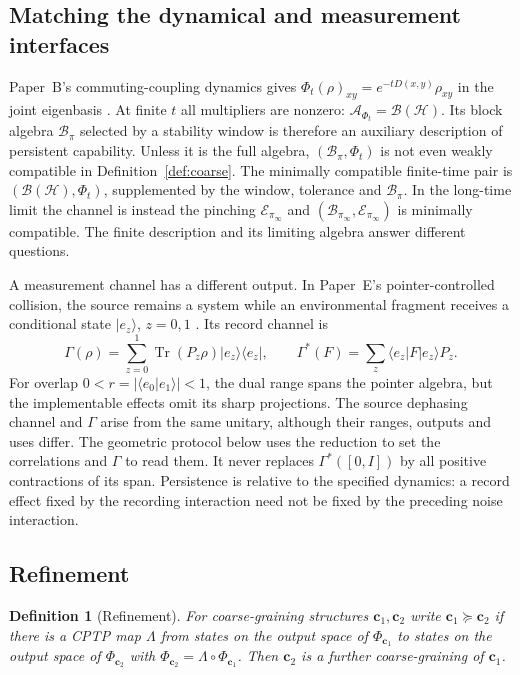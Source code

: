 \documentclass[12pt,a4paper]{article}
\newtheorem{definition}[theorem]{Definition}
\begin{document}
\subsection{Matching the dynamical and measurement interfaces}
\label{sec:interfaces}

Paper~B's commuting-coupling dynamics gives
$\Phi_t(\rho)_{xy}=e^{-tD(x,y)}\rho_{xy}$ in the joint eigenbasis
\cite{Liu2026PaperB}. At finite $t$ all multipliers are nonzero:
$\mathcal A_{\Phi_t}=\mathcal B(\mathcal H)$. Its block algebra
$\mathcal B_\pi$ selected by a stability window is therefore an auxiliary
description of persistent capability. Unless it is the full algebra,
$(\mathcal B_\pi,\Phi_t)$ is not even weakly compatible in
Definition~\ref{def:coarse}. The minimally compatible finite-time pair is
$(\mathcal B(\mathcal H),\Phi_t)$, supplemented by the window, tolerance
and $\mathcal B_\pi$. In the long-time limit the channel is instead the
pinching $\mathcal E_{\pi_\infty}$ and
$(\mathcal B_{\pi_\infty},\mathcal E_{\pi_\infty})$ is minimally
compatible. The finite description and its limiting algebra answer
different questions.

A measurement channel has a different output. In Paper~E's
pointer-controlled collision, the source remains a system while an
environmental fragment receives a conditional state
$|e_z\rangle$, $z=0,1$ \cite{Liu2026PaperE}. Its record channel is
\[
\Gamma(\rho)=\sum_{z=0}^1\operatorname{Tr}(P_z\rho)
             |e_z\rangle\langle e_z|,\qquad
\Gamma^*(F)=\sum_z\langle e_z|F|e_z\rangle P_z .
\]
For overlap $0<r=|\langle e_0|e_1\rangle|<1$, the dual range spans the
pointer algebra, but the implementable effects omit its sharp
projections. The source dephasing channel and $\Gamma$ arise from the
same unitary, although their ranges, outputs and uses differ. The
geometric protocol below uses the reduction to set the correlations
and $\Gamma$ to read them. It never replaces $\Gamma^*([0,I])$ by all
positive contractions of its span. Persistence is relative to the
specified dynamics: a record effect fixed by the recording interaction
need not be fixed by the preceding noise interaction.

\subsection{Refinement}

\begin{definition}[Refinement]
\label{def:refine}
For coarse-graining structures $\mathbf c_1,\mathbf c_2$ write $\mathbf c_1\succeq\mathbf c_2$ if there is a CPTP map $\Lambda$ from states on the output space of $\Phi_{\mathbf c_1}$ to states on the output space of $\Phi_{\mathbf c_2}$ with $\Phi_{\mathbf c_2}=\Lambda\circ\Phi_{\mathbf c_1}$. Then $\mathbf c_2$ is a further coarse-graining of $\mathbf c_1$.
\end{definition}
\end{document}
